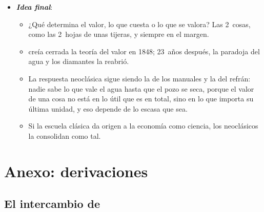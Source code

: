 \documentclass[11pt]{article}
\begin{document}
\begin{itemize}
\begin{itemize}
  \item Con todo, el instrumental ha sobrevivido a sus críticos, porque une en una sola teoría el valor y la distribución, y hoy lo usa a diario quien no ha leído a sus autores. Lo dijo  en 1936: «los hombres prácticos, que se creen libres de toda influencia intelectual, suelen ser esclavos de algún economista difunto».\footnote{En el original: «Practical men, who believe themselves to be quite exempt from any intellectual influences, are usually the slaves of some defunct economist», en el capítulo~24~de la \emph{Teoría general}\nocite{Keynes1936}.}
  \end{itemize}
\item \textbf{\emph{Idea final}}:
  \begin{itemize}
  \item ¿Qué determina el valor, lo que cuesta o lo que se valora? Las 2~cosas, como las 2~hojas de unas tijeras, y siempre en el margen.
  \item {} creía cerrada la teoría del valor en 1848; 23~años después, la paradoja del agua y los diamantes la reabrió.
  \item La respuesta neoclásica sigue siendo la de los manuales y la del refrán: nadie sabe lo que vale el agua hasta que el pozo se seca, porque el valor de una cosa no está en lo útil que es en total, sino en lo que importa su última unidad, y eso depende de lo escasa que sea.
  \item Si la escuela clásica da origen a la economía como ciencia, los neoclásicos la consolidan como tal.
  \end{itemize}
\end{itemize}

\clearpage
\appendix

\section{Anexo: derivaciones}\label{anexo:derivaciones}

\subsection{El intercambio de }\label{anexo:jevons}
\end{document}
